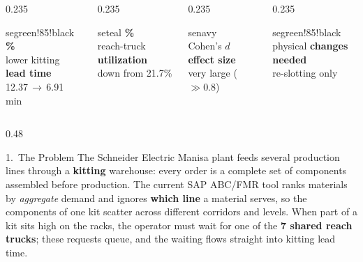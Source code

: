 \documentclass[final]{beamer}
\newcommand{\bignum}[1]{\color{senavy}\bfseries\fontsize{96}{96}\selectfont #1}
\begin{document}
\begin{frame}[t]

\begin{columns}[t,totalwidth=\textwidth]
\begin{column}{0.235\textwidth}
\begin{statcard}{segreen!85!black}
{\bignum{44\%}}\\[4mm]{\large lower kitting \textbf{lead time}}\\[1mm]{12.37\,$\rightarrow$\,6.91 min}
\end{statcard}\end{column}
\begin{column}{0.235\textwidth}
\begin{statcard}{seteal}
{\bignum{1.3\%}}\\[4mm]{\large reach-truck \textbf{utilization}}\\[1mm]{down from 21.7\%}
\end{statcard}\end{column}
\begin{column}{0.235\textwidth}
\begin{statcard}{senavy}
{\bignum{3.10}}\\[4mm]{\large Cohen's $d$ \textbf{effect size}}\\[1mm]{very large ($\gg 0.8$)}
\end{statcard}\end{column}
\begin{column}{0.235\textwidth}
\begin{statcard}{segreen!85!black}
{\bignum{0}}\\[4mm]{\large physical \textbf{changes needed}}\\[1mm]{re-slotting only}
\end{statcard}\end{column}
\end{columns}

\vspace{16mm}

\begin{columns}[t,totalwidth=\textwidth]

\begin{column}{0.48\textwidth}
\begin{block}{1.\, The Problem}
\justifying
The Schneider Electric Manisa plant feeds several production lines through a
\textbf{kitting} warehouse: every order is a complete set of components
assembled before production. The current SAP ABC/FMR tool ranks materials by
\emph{aggregate} demand and ignores \textbf{which line} a material serves, so
the components of one kit scatter across different corridors and levels. When
part of a kit sits high on the racks, the operator must wait for one of the
\textbf{7 shared reach trucks}; these requests queue, and the waiting flows
straight into kitting lead time.
\vspace{6mm}


\end{block}
\end{column}
\end{columns}
\end{frame}
\end{document}
